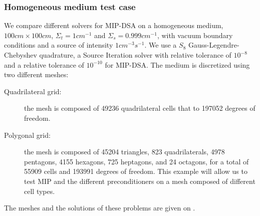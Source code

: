 \subsubsection{Homogeneous medium test case}  \label{sec_homog}
We compare different solvers for MIP-DSA on a homogeneous medium, $100cm
\times 100cm$, $\Sigma_t = 1cm^{-1}$ and $\Sigma_s = 0.999cm^{-1}$, with
vacuum boundary conditions and a source of intensity $1cm^{-3}s^{-1}$. We
use a $S_8$ Gauss-Legendre-Chebyshev quadrature, a Source Iteration solver
with relative tolerance of $10^{-8}$ and a relative tolerance of
$10^{-10}$ for MIP-DSA. The medium is discretized using two different meshes:
\begin{description}
  \item[Quadrilateral grid:] the mesh is composed of 49236 quadrilateral
    cells that to 197052 degrees of freedom.
  \item[Polygonal grid:] the mesh is composed of 45204 triangles, 823
    quadrilaterals, 4978 pentagons, 4155 hexagons, 725 heptagons, and 24
    octagons, for a total of 55909 cells and 193991 degrees of freedom. This
    example will allow us to test MIP and the different preconditioners on a
    mesh composed of different cell types.
\end{description}
The meshes and the solutions of these problems are given on .
